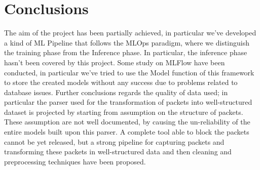 \documentclass[sigconf]{acmart}
\begin{document}
\section{Conclusions}
The aim of the project has been partially achieved, in particular we've developed a kind of ML Pipeline that follows the MLOps paradigm, where we distinguish the training phase from the Inference phase. In particular, the inference phase hasn't been covered by this project. Some study on MLFlow have been conducted, in particular we've tried to use the Model function of this framework to store the created models without any success due to problems related to database issues.
Further conclusions regards the quality of data used; in particular the parser used for the transformation of packets into well-structured dataset is projected by starting from assumption on the structure of packets. These assumption are not well documented, by causing the un-reliability of the entire models built upon this parser.
A complete tool able to block the packets cannot be yet released, but a strong pipeline for capturing packets and transforming these packets in well-structured data and then cleaning and preprocessing techniques have been proposed.
    
    
\end{document}
